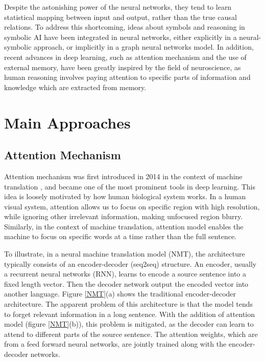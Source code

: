 \documentclass[journal]{IEEEtran}
\begin{document}
Despite the astonishing power of the neural networks, they tend to learn statistical mapping between input and output, rather than the true causal relations. 
To address this shortcoming, ideas about symbols and reasoning in symbolic AI have been integrated in neural networks, 
either explicitly in a neural-symbolic approach, or implicitly in a graph neural networks model.
In addition, recent advances in deep learning, such as attention mechanism and the use of external memory, have been greatly inspired by the field of neuroscience, as 
human reasoning involves paying attention to specific parts of information and knowledge which are extracted from memory.

\section{Main Approaches}
\subsection{Attention Mechanism}
Attention mechanism was first introduced in 2014 in the context of machine translation \cite{bahdanau2014neural}, 
and became one of the most prominent tools in deep learning. 
This idea is loosely motivated by how human biological system works. 
In a human visual system, attention allows us to focus on specific region with high resolution, 
while ignoring other irrelevant information, making unfocused region blurry.
Similarly, in the context of machine translation, attention model enables the machine to focus on specific words at a time 
rather than the full sentence.

To illustrate, in a neural machine translation model (NMT), the architecture typically consists of an encoder-decoder (seq2seq) structure.
An encoder, usually a recurrent neural networks (RNN), learns to encode a source sentence into a fixed length vector.
Then the decoder network output the encoded vector into another language. Figure \ref{NMT}(a) shows the traditional encoder-decoder architecture.
The apparent problem of this architecture is that the model tends to forget relevant information in a long sentence.
With the addition of attention model (figure \ref{NMT}(b)), this problem is mitigated, 
as the decoder can learn to attend to different parts of the source sentence. 
The attention weights, which are from a feed forward neural networks, are jointly trained along with the encoder-decoder networks.
\end{document}
